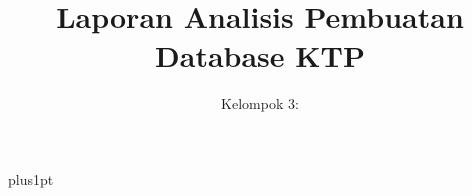 \documentclass[12pt]{ociamthesis}  %
\title{Laporan Analisis Pembuatan Database KTP \\[1ex]  } %
\author{Kelompok 3:\\[1ex] }  %
\begin{document}
\baselineskip=18pt plus1pt

\setcounter{secnumdepth}{3}
\setcounter{tocdepth}{3}

\maketitle                  %

\begin{romanpages}          %
\tableofcontents            %
\listoffigures             %
\end{romanpages}            %





\end{document}
